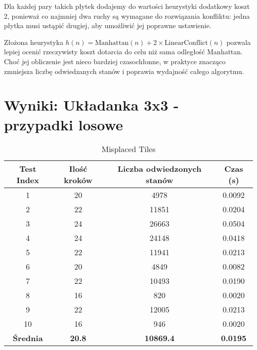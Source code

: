 \documentclass{article}
\begin{document}
Dla każdej pary takich płytek dodajemy do wartości heurystyki dodatkowy koszt 2, ponieważ co najmniej dwa ruchy są wymagane do rozwiązania konfliktu: jedna płytka musi ustąpić drugiej, aby umożliwić jej poprawne ustawienie.

Złożona heurystyka \( h(n) = \text{Manhattan}(n) + 2 \times \text{LinearConflict}(n) \) pozwala lepiej ocenić rzeczywisty koszt dotarcia do celu niż sama odległość Manhattan. Choć jej obliczenie jest nieco bardziej czasochłonne, w praktyce znacząco zmniejsza liczbę odwiedzanych stanów i poprawia wydajność całego algorytmu.

\section{Wyniki: Układanka 3x3 - przypadki losowe}
\begin{table}[H]
\centering
\caption{Misplaced Tiles}
\begin{tabular}{|c|c|c|c|}
\hline
Test Index & Ilość kroków & Liczba odwiedzonych stanów & Czas (s) \\ \hline
1 & 20 & 4978 & 0.0092 \\ \hline
2 & 22 & 11851 & 0.0204 \\ \hline
3 & 24 & 26663 & 0.0504 \\ \hline
4 & 24 & 24148 & 0.0418 \\ \hline
5 & 22 & 11941 & 0.0213 \\ \hline
6 & 20 & 4849 & 0.0082 \\ \hline
7 & 22 & 10493 & 0.0190 \\ \hline
8 & 16 & 820 & 0.0020 \\ \hline
9 & 22 & 12005 & 0.0213 \\ \hline
10 & 16 & 946 & 0.0020 \\ \hline
\textbf{\textbf{Średnia}} & \textbf{20.8} & \textbf{10869.4} & \textbf{0.0195} \\ \hline
\end{tabular}
\end{table}
\end{document}
